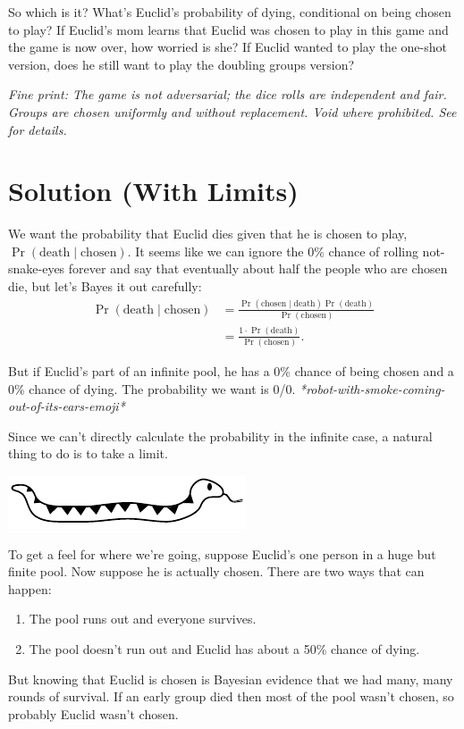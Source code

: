 \documentclass[article,twocolumn]{memoir}
\newcommand{\snakedivider}{
\vspace{.2em}
\begin{center}
\includegraphics[width=.25\linewidth]{cute-snake-divider}
\end{center}
\vspace{.1em}
}
\begin{document}
\vspace{1em}

So which is it? 
What's Euclid's probability of dying, conditional on being chosen to play?
If Euclid's mom learns that Euclid was chosen to play in this game and the game is now over, how worried is she?
If Euclid wanted to play the one-shot version, does he still want to play the doubling groups version?

\vspace{1em}

\emph{Fine print: 
The game is not adversarial; the dice rolls are independent and fair.
Groups are chosen uniformly and without replacement.
Void where prohibited.
See \citet{barth} for details.
}

\newpage

\chapter{Solution (With Limits)}

We want the probability that Euclid dies given that he is chosen to play,
$\Pr(\text{death}\mid\text{chosen})$.
It seems like we can ignore the 0\% chance of rolling not-snake-eyes forever and say that eventually about half the people who are chosen die, but let's Bayes it out carefully:
\begin{equation*}
\begin{split}
\Pr(\text{death}\mid\text{chosen}) & =
\frac{\Pr(\text{chosen}\mid\text{death}) \Pr(\text{death})}{\Pr(\text{chosen})} \\
& = \frac{1\cdot\Pr(\text{death})}{\Pr(\text{chosen})}.
\end{split}
\end{equation*}

But if Euclid's part of an infinite pool, he has a 0\% chance of being chosen and a 0\% chance of dying.
The probability we want is 0/0. 
\emph{*robot-with-smoke-coming-out-of-its-ears-emoji*}

Since we can't directly calculate the probability in the infinite case, a natural thing to do is to take a limit.

\snakedivider

To get a feel for where we're going, suppose Euclid's one person in a huge but finite pool.
Now suppose he is actually chosen. 
There are two ways that can happen: 
\begin{enumerate}
\item The pool runs out and everyone survives.
\item The pool doesn't run out and Euclid has about a 50\% chance of dying.
\end{enumerate}
But knowing that Euclid is chosen is Bayesian evidence that we had many, many rounds of survival.
If an early group died then most of the pool wasn't chosen, so probably Euclid wasn't chosen.
\end{document}
